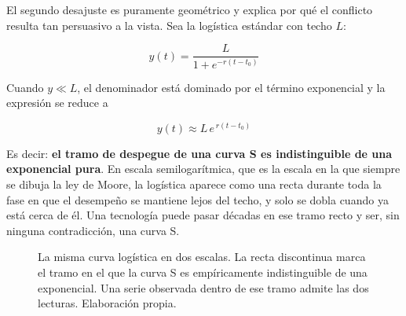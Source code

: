 \documentclass[11pt,letterpaper]{article}
\begin{document}
El segundo desajuste es puramente geométrico y explica por qué el conflicto
resulta tan persuasivo a la vista. Sea la logística estándar con techo $L$:

\begin{equation}
  y(t) = \frac{L}{1 + e^{-r(t - t_0)}}
  \label{eq:logistica}
\end{equation}

Cuando $y \ll L$, el denominador está dominado por el término exponencial y la
expresión se reduce a

\begin{equation}
  y(t) \approx L\, e^{\,r(t-t_0)}
  \label{eq:aprox}
\end{equation}

Es decir: \textbf{el tramo de despegue de una curva S es indistinguible de una
exponencial pura}. En escala semilogarítmica, que es la escala en la que siempre
se dibuja la ley de Moore, la logística aparece como una recta durante toda la
fase en que el desempeño se mantiene lejos del techo, y solo se dobla cuando ya
está cerca de él. Una tecnología puede pasar décadas en ese tramo recto y ser,
sin ninguna contradicción, una curva S.

\begin{figure}[ht]
  \centering
  \caption{La misma curva logística en dos escalas. La recta discontinua marca
  el tramo en el que la curva S es empíricamente indistinguible de una
  exponencial. Una serie observada dentro de ese tramo admite las dos lecturas.
  Elaboración propia.}
  \label{fig:escalas}
\end{figure}
\end{document}
